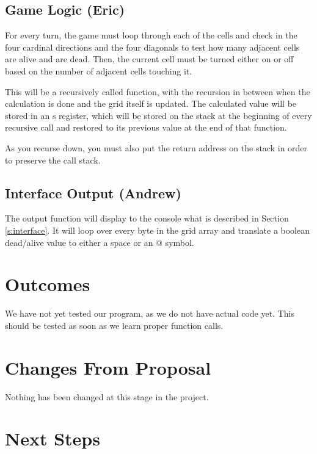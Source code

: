 \documentclass[12pt]{article}
\begin{document}
  

  \subsection{Game Logic (Eric)}
  For every turn, the game must loop through each of the cells and check in the
  four cardinal directions and the four diagonals to test how many adjacent
  cells are alive and are dead. Then, the current cell must be turned either on
  or off based on the number of adjacent cells touching it.

  This will be a recursively called function, with the recursion in between when
  the calculation is done and the grid itself is updated. The calculated value
  will be stored in an s register, which will be stored on the stack at the
  beginning of every recursive call and restored to its previous value at the
  end of that function.

  As you recurse down, you must also put the return address on the stack in
  order to preserve the call stack. 

  

  \subsection{Interface Output (Andrew)}

  The output function will display to the console what is described in Section
  \ref{s:interface}. It will loop over every byte in the grid array and
  translate a boolean dead/alive value to either a space or an @ symbol.

  

  \section{Outcomes}
  We have not yet tested our program, as we do not have actual code yet. This
  should be tested as soon as we learn proper function calls.

  \section{Changes From Proposal}
  Nothing has been changed at this stage in the project.

  \section{Next Steps}
\end{document}
